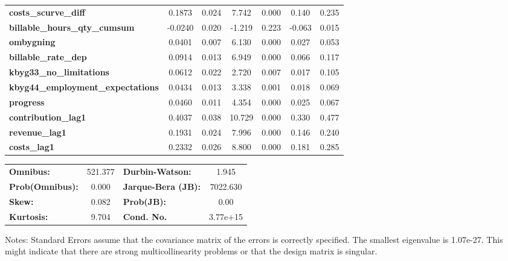 \begin{center}
\begin{tabular}{lcccccc}
\textbf{costs\_scurve\_diff}              &       0.1873  &        0.024     &     7.742  &         0.000        &        0.140    &        0.235     \\
\textbf{billable\_hours\_qty\_cumsum}     &      -0.0240  &        0.020     &    -1.219  &         0.223        &       -0.063    &        0.015     \\
\textbf{ombygning}                        &       0.0401  &        0.007     &     6.130  &         0.000        &        0.027    &        0.053     \\
\textbf{billable\_rate\_dep}              &       0.0914  &        0.013     &     6.949  &         0.000        &        0.066    &        0.117     \\
\textbf{kbyg33\_no\_limitations}          &       0.0612  &        0.022     &     2.720  &         0.007        &        0.017    &        0.105     \\
\textbf{kbyg44\_employment\_expectations} &       0.0434  &        0.013     &     3.338  &         0.001        &        0.018    &        0.069     \\
\textbf{progress}                         &       0.0460  &        0.011     &     4.354  &         0.000        &        0.025    &        0.067     \\
\textbf{contribution\_lag1}               &       0.4037  &        0.038     &    10.729  &         0.000        &        0.330    &        0.477     \\
\textbf{revenue\_lag1}                    &       0.1931  &        0.024     &     7.996  &         0.000        &        0.146    &        0.240     \\
\textbf{costs\_lag1}                      &       0.2332  &        0.026     &     8.800  &         0.000        &        0.181    &        0.285     \\
\bottomrule
\end{tabular}
\begin{tabular}{lclc}
\textbf{Omnibus:}       & 521.377 & \textbf{  Durbin-Watson:     } &    1.945  \\
\textbf{Prob(Omnibus):} &   0.000 & \textbf{  Jarque-Bera (JB):  } & 7022.630  \\
\textbf{Skew:}          &   0.082 & \textbf{  Prob(JB):          } &     0.00  \\
\textbf{Kurtosis:}      &   9.704 & \textbf{  Cond. No.          } & 3.77e+15  \\
\bottomrule
\end{tabular}
\end{center}

Notes: \newline
 [1] Standard Errors assume that the covariance matrix of the errors is correctly specified. \newline
 [2] The smallest eigenvalue is 1.07e-27. This might indicate that there are \newline
 strong multicollinearity problems or that the design matrix is singular.